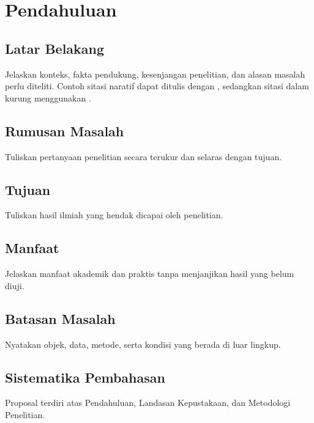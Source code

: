 \chapter{Pendahuluan}
\section{Latar Belakang}
Jelaskan konteks, fakta pendukung, kesenjangan penelitian, dan alasan masalah
perlu diteliti. Contoh sitasi naratif dapat ditulis dengan
\textcite{knuth1984texbook}, sedangkan sitasi dalam kurung menggunakan
\parencite{lamport1994latex}.

\section{Rumusan Masalah}
Tuliskan pertanyaan penelitian secara terukur dan selaras dengan tujuan.

\section{Tujuan}
Tuliskan hasil ilmiah yang hendak dicapai oleh penelitian.

\section{Manfaat}
Jelaskan manfaat akademik dan praktis tanpa menjanjikan hasil yang belum diuji.

\section{Batasan Masalah}
Nyatakan objek, data, metode, serta kondisi yang berada di luar lingkup.

\section{Sistematika Pembahasan}
Proposal terdiri atas Pendahuluan, Landasan Kepustakaan, dan Metodologi Penelitian.
